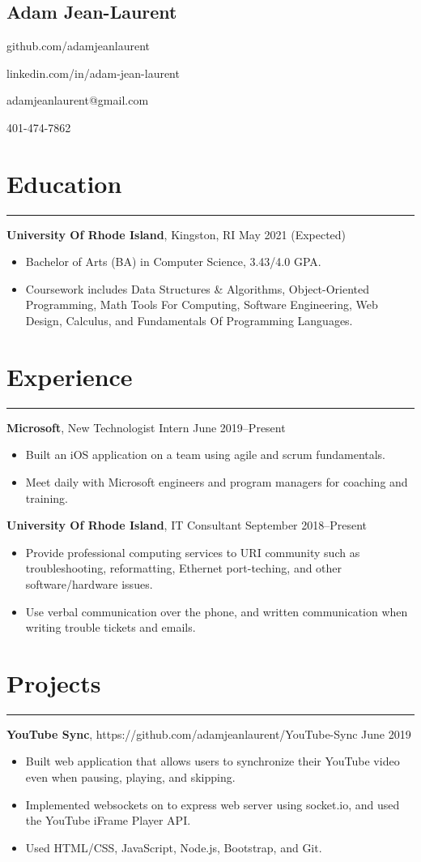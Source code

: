 \documentclass[11pt]{article}
\newcommand{\name}[1]{\begin{center}\section*{\huge #1}\end{center}}
\newcommand{\topinfo}[1]{\begin{center}\vspace{-0.2cm}#1\vspace{-0.2cm}\end{center}}
\newcommand{\resumesection}[1]{\vspace{-0.2cm}\section*{#1}\vspace{-0.2cm}\hrule\vspace{0.2cm}}
\begin{document}
\name{Adam Jean-Laurent}
\topinfo{github.com/adamjeanlaurent}
\topinfo{linkedin.com/in/adam-jean-laurent}
\topinfo{adamjeanlaurent@gmail.com}
\topinfo{401-474-7862}

\resumesection{Education}

\textbf{University Of Rhode Island}, Kingston, RI \hfill May 2021 (Expected)
\begin{itemize}
	\item Bachelor of Arts (BA) in Computer Science, 3.43/4.0 GPA.
	\item Coursework includes Data Structures \& Algorithms, Object-Oriented Programming, Math Tools For Computing, Software Engineering, Web Design, Calculus, and Fundamentals Of Programming Languages. 
\end{itemize}

\resumesection{Experience}

\textbf{Microsoft}, New Technologist Intern \hfill June 2019--Present
\begin{itemize}
	\item Built an iOS application on a team using agile and scrum fundamentals.
	\item Meet daily with Microsoft engineers and program managers for coaching and training.
\end{itemize}

\textbf{University Of Rhode Island}, IT Consultant \hfill September 2018--Present
\begin{itemize}
	\item Provide professional computing services to URI community such as troubleshooting, reformatting, Ethernet port-teching, and other software/hardware issues.
	\item Use verbal communication over the phone, and written communication when writing trouble tickets and emails.
\end{itemize}

\resumesection{Projects}

\textbf{YouTube Sync}, https://github.com/adamjeanlaurent/YouTube-Sync  \hfill June 2019
\begin{itemize}
	\item Built web application that allows users to synchronize their YouTube video even when pausing, playing, and skipping.
	\item Implemented websockets on to express web server using socket.io, and used the YouTube iFrame Player API.
	\item Used HTML/CSS, JavaScript, Node.js, Bootstrap, and Git.
\end{itemize}
\end{document}
